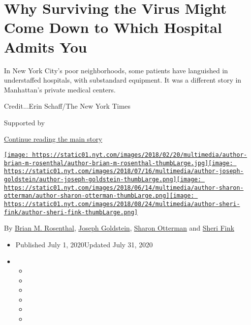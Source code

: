 \hypertarget{why-surviving-the-virus-might-come-down-to-which-hospital-admits-you}{%
\section{Why Surviving the Virus Might Come Down to Which Hospital
Admits
You}\label{why-surviving-the-virus-might-come-down-to-which-hospital-admits-you}}

In New York City's poor neighborhoods, some patients have languished in
understaffed hospitals, with substandard equipment. It was a different
story in Manhattan's private medical centers.

Credit...Erin Schaff/The New York Times

Supported by

\protect\hyperlink{after-sponsor}{Continue reading the main story}

\href{https://www.nytimes.com/by/brian-m-rosenthal}{\texttt{[image: https://static01.nyt.com/images/2018/02/20/multimedia/author-brian-m-rosenthal/author-brian-m-rosenthal-thumbLarge.jpg]}}\href{https://www.nytimes.com/by/joseph-goldstein}{\texttt{[image: https://static01.nyt.com/images/2018/07/16/multimedia/author-joseph-goldstein/author-joseph-goldstein-thumbLarge.png]}}\href{https://www.nytimes.com/by/sharon-otterman}{\texttt{[image: https://static01.nyt.com/images/2018/06/14/multimedia/author-sharon-otterman/author-sharon-otterman-thumbLarge.png]}}\href{https://www.nytimes.com/by/sheri-fink}{\texttt{[image: https://static01.nyt.com/images/2018/08/24/multimedia/author-sheri-fink/author-sheri-fink-thumbLarge.png]}}

By \href{https://www.nytimes.com/by/brian-m-rosenthal}{Brian M.
Rosenthal}, \href{https://www.nytimes.com/by/joseph-goldstein}{Joseph
Goldstein}, \href{https://www.nytimes.com/by/sharon-otterman}{Sharon
Otterman} and \href{https://www.nytimes.com/by/sheri-fink}{Sheri Fink}

\begin{itemize}
\item
  Published July 1, 2020Updated July 31, 2020
\item
  \begin{itemize}
  \item
  \item
  \item
  \item
  \item
  \item
  \end{itemize}
\end{itemize}

